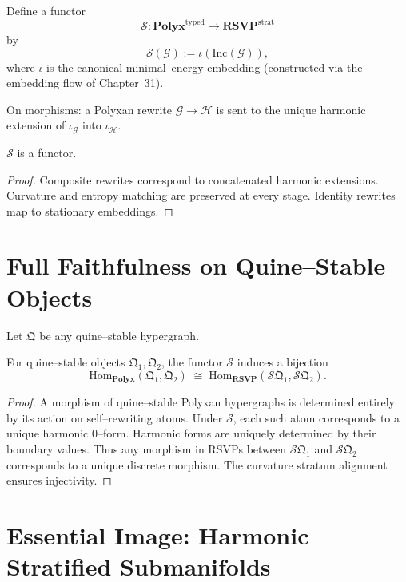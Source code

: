 Define a functor
\[
\mathcal{S} : \mathbf{Polyx}^{\mathrm{typed}}
  \longrightarrow \mathbf{RSVP}^{\mathrm{strat}}
\]
by
\[
\mathcal{S}(\mathcal{G}) := \iota(\mathrm{Inc}(\mathcal{G})),
\]
where $\iota$ is the canonical minimal--energy embedding
(constructed via the embedding flow of Chapter~31).

On morphisms:
a Polyxan rewrite $\mathcal{G}\to\mathcal{H}$
is sent to the unique harmonic extension
of $\iota_{\mathcal{G}}$ into $\iota_{\mathcal{H}}$.

\begin{proposition}[Functoriality]
$\mathcal{S}$ is a functor.
\end{proposition}

\begin{proof}
Composite rewrites correspond to concatenated harmonic extensions.
Curvature and entropy matching are preserved at every stage.
Identity rewrites map to stationary embeddings.
\end{proof}

\section{Full Faithfulness on Quine--Stable Objects}

Let $\mathfrak{Q}$ be any quine--stable hypergraph.

\begin{theorem}
\label{thm:28-fullfaithful}
For quine--stable objects $\mathfrak{Q}_1,\mathfrak{Q}_2$,
the functor $\mathcal{S}$ induces a bijection
\[
\mathrm{Hom}_{\mathbf{Polyx}}(\mathfrak{Q}_1,\mathfrak{Q}_2)
\;\cong\;
\mathrm{Hom}_{\mathbf{RSVP}}(\mathcal{S}\mathfrak{Q}_1,\mathcal{S}\mathfrak{Q}_2).
\]
\end{theorem}

\begin{proof}
A morphism of quine--stable Polyxan hypergraphs is determined entirely by
its action on self--rewriting atoms.
Under $\mathcal{S}$, each such atom corresponds to a unique harmonic 0--form.
Harmonic forms are uniquely determined by their boundary values.
Thus any morphism in RSVPs between $\mathcal{S}\mathfrak{Q}_1$ and $\mathcal{S}\mathfrak{Q}_2$
corresponds to a unique discrete morphism.
The curvature stratum alignment ensures injectivity.
\end{proof}

\section{Essential Image: Harmonic Stratified Submanifolds}


